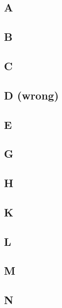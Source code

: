 \subsection{A}
\raggedbottom
\hrulefill
\subsection{B}
\raggedbottom
\hrulefill
\subsection{C}
\raggedbottom
\hrulefill
\subsection{D (wrong)}
\raggedbottom
\hrulefill
\subsection{E}
\raggedbottom
\hrulefill
\subsection{G}
\raggedbottom
\hrulefill
\subsection{H}
\raggedbottom
\hrulefill
\subsection{K}
\raggedbottom
\hrulefill
\subsection{L}
\raggedbottom
\hrulefill
\subsection{M}
\raggedbottom
\hrulefill
\subsection{N}
\raggedbottom
\hrulefill

